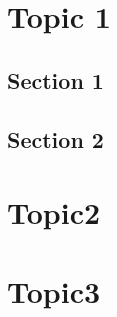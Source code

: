 \appendix
\chapter{Topic 1}
\section{Section 1}
\section{Section 2}
\chapter{Topic2}
\label{sec:topic2}
\chapter{Topic3}
\label{chap:topic3}
